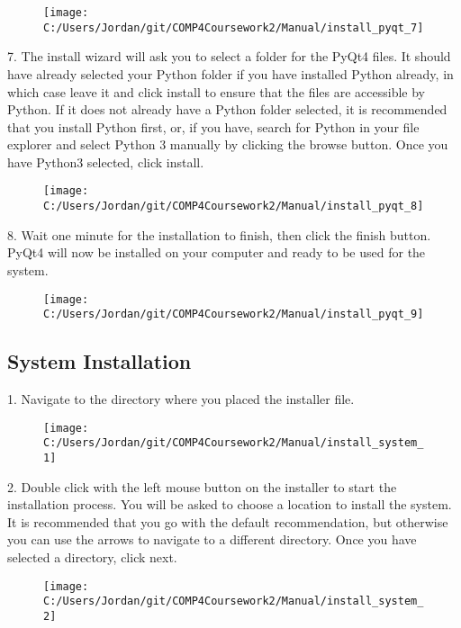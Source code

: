 \begin{figure}[H]
    \texttt{[image: C:/Users/Jordan/git/COMP4Coursework2/Manual/install\_pyqt\_7]}
\end{figure}

7. The install wizard will ask you to select a folder for the PyQt4 files. It should have already selected your Python folder if you have installed Python already, in which case leave it and click install to ensure that the files are accessible by Python. If it does not already have a Python folder selected, it is recommended that you install Python first, or, if you have, search for Python in your file explorer and select Python 3 manually by clicking the browse button. Once you have Python3 selected, click install.

\begin{figure}[H]
    \texttt{[image: C:/Users/Jordan/git/COMP4Coursework2/Manual/install\_pyqt\_8]}
\end{figure}

8. Wait one minute for the installation to finish, then click the finish button. PyQt4 will now be installed on your computer and ready to be used for the system.

\begin{figure}[H]
    \texttt{[image: C:/Users/Jordan/git/COMP4Coursework2/Manual/install\_pyqt\_9]}
\end{figure}

\subsection{System Installation}

1. Navigate to the directory where you placed the installer file.

\begin{figure}[H]
    \texttt{[image: C:/Users/Jordan/git/COMP4Coursework2/Manual/install\_system\_1]}
\end{figure}

2. Double click with the left mouse button on the installer to start the installation process. You will be asked to choose a location to install the system. It is recommended that you go with the default recommendation, but otherwise you can use the arrows to navigate to a different directory. Once you have selected a directory, click next.

\begin{figure}[H]
    \texttt{[image: C:/Users/Jordan/git/COMP4Coursework2/Manual/install\_system\_2]}
\end{figure}

